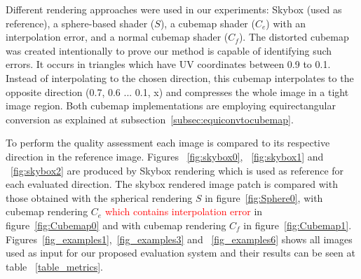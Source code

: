 \documentclass[10pt,conference,pdftex]{IEEEtran}
\begin{document}
\begin{table}[!t]
 \centering
    \caption{Metrics Results Example}
       \label{table_metrics}
\end{table}

Different rendering approaches were used in our experiments: Skybox (used as reference), a sphere-based shader ($S$), a cubemap shader ($C_e$) with an interpolation error, and a normal cubemap shader ($C_f$). The distorted cubemap was created intentionally to prove our method is capable of identifying such errors. It occurs in triangles which have UV coordinates between 0.9 to 0.1. Instead of interpolating to the chosen direction, this cubemap interpolates to the opposite direction (0.7, 0.6 ... 0.1, x) and compresses the whole image in a tight image region. Both cubemap implementations are employing equirectangular conversion as explained at subsection~\ref{subsec:equiconvtocubemap}.


To perform the quality assessment each image is compared to its respective direction in the reference image. Figures ~\ref{fig:skybox0}, ~\ref{fig:skybox1} and ~\ref{fig:skybox2} are produced by Skybox rendering which is used as reference for each evaluated direction. The skybox rendered image patch is compared with those obtained with the spherical rendering $S$ in figure~\ref{fig:Sphere0}, with cubemap rendering $C_e$ \textcolor{red}{which contains interpolation error} in figure~\ref{fig:Cubemap0} and with cubemap rendering $C_f$ in figure~\ref{fig:Cubemap1}.  Figures~\ref{fig_examples1},~\ref{fig_examples3} and ~\ref{fig_examples6} shows all images used as input for our proposed evaluation system and their results can be seen at table ~\ref{table_metrics}.
\end{document}
